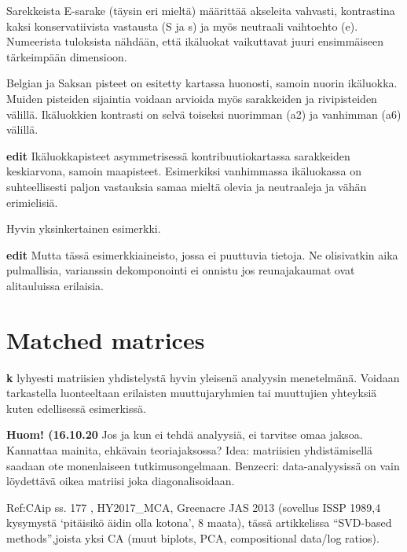 \documentclass[
  finnish,
]{book}
\begin{document}
Sarekkeista E-sarake (täysin eri mieltä) määrittää akseleita vahvasti, kontrastina
kaksi konservatiivista vastausta (S ja s) ja myös neutraali vaihtoehto (e).
Numeerista tuloksista nähdään, että ikäluokat vaikuttavat juuri ensimmäiseen tärkeimpään dimensioon.

Belgian ja Saksan pisteet on esitetty kartassa huonosti, samoin nuorin ikäluokka.
Muiden pisteiden sijaintia voidaan arvioida myös sarakkeiden ja rivipisteiden
välillä. Ikäluokkien kontrasti on selvä toiseksi nuorimman (a2) ja vanhimman (a6)
välillä.

\textbf{edit} Ikäluokkapisteet asymmetrisessä kontribuutiokartassa sarakkeiden keskiarvona,
samoin maapisteet. Esimerkiksi vanhimmassa ikäluokassa on suhteellisesti paljon
vastauksia samaa mieltä olevia ja neutraaleja ja vähän erimielisiä.

Hyvin yksinkertainen esimerkki.

\textbf{edit} Mutta tässä esimerkkiaineisto, jossa ei puuttuvia tietoja. Ne olisivatkin
aika pulmallisia, varianssin dekomponointi ei onnistu jos reunajakaumat ovat
alitauluissa erilaisia.

\hypertarget{matched-matrices}{%
\section{Matched matrices}\label{matched-matrices}}

\textbf{k} lyhyesti matriisien yhdistelystä hyvin yleisenä analyysin menetelmänä.
Voidaan tarkastella luonteeltaan erilaisten muuttujaryhmien tai muuttujien
yhteyksiä kuten edellisessä esimerkissä.

\textbf{Huom! (16.10.20} Jos ja kun ei tehdä analyysiä, ei tarvitse omaa jaksoa.
Kannattaa mainita, ehkävain teoriajaksossa? Idea: matriisien yhdistämisellä
saadaan ote monenlaiseen tutkimusongelmaan. Benzecri: data-analyysissä on vain
löydettävä oikea matriisi joka diagonalisoidaan.

Ref:CAip ss. 177 \citep{RefWorks:doc:5a857a43e4b0ed2d44664d78}, HY2017\_MCA, Greenacre JAS 2013
(sovellus ISSP 1989,4 kysymystä `pitäisikö äidin olla kotona', 8 maata), tässä
artikkelissa ``SVD-based methods'',joista yksi CA (muut biplots, PCA, compositional data/log ratios).
\citep{RefWorks:doc:5b6f159ce4b0bc0f31734b76}
\end{document}
